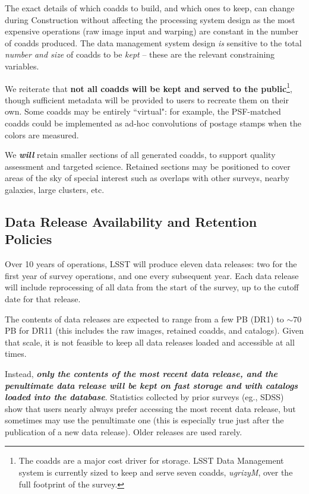 \documentclass[12pt]{article}
\begin{document}
The exact details of which coadds to build, and which ones to keep, can change during Construction without affecting the processing system design as the most expensive operations (raw image input and warping) are constant in the number of coadds produced. The data management system design {\em is} sensitive to the total {\em number and size} of coadds to be {\em kept} -- these are the relevant constraining variables.

We reiterate that {\bf not all coadds will be kept and served to the public}\footnote{The coadds are a major cost driver for storage. LSST Data Management system is currently sized to keep and serve seven coadds, {\em ugrizyM}, over the full footprint of the survey.}, though sufficient metadata will be provided to users to recreate them on their own. Some coadds may be entirely ``virtual": for example, the PSF-matched coadds could be implemented as ad-hoc convolutions of postage stamps when the colors are measured.

We {\em \bf will} retain smaller sections of all generated coadds, to support quality assessment and targeted science. Retained sections may be positioned to cover areas of the sky of special interest such as overlaps with other surveys, nearby galaxies, large clusters, etc.

\subsection{Data Release Availability and Retention Policies}
\label{sec:retention}

Over 10 years of operations, LSST will produce eleven data releases: two for the first year of survey operations, and one every subsequent year. Each data release will include reprocessing of all data from the start of the survey, up to the cutoff date for that release.

The contents of data releases are expected to range from a few PB (DR1) to $\sim 70$ PB for DR11 (this includes the raw images, retained coadds, and catalogs). Given that scale, it is not feasible to keep all data releases loaded and accessible at all times.

Instead, {\bf \em only the contents of the most recent data release, and the penultimate data release will be kept on fast storage and with catalogs loaded into the database}. Statistics collected by prior surveys (eg., SDSS) show that users nearly always prefer accessing the most recent data release, but sometimes may use the penultimate one (this is especially true just after the publication of a new data release). Older releases are used rarely.
\end{document}
